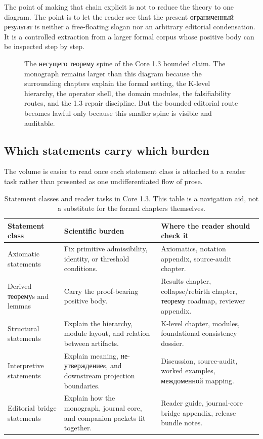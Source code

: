 The point of making that chain explicit is not to reduce the theory to one diagram. The point is
to let the reader see that the present ограниченный результат is neither a free-floating slogan nor an
arbitrary editorial condensation. It is a controlled extraction from a larger formal corpus whose
positive body can be inspected step by step.

\begin{figure}[htbp]
\centering

\caption{The несущего теорему spine of the Core 1.3 bounded claim. The monograph remains
larger than this diagram because the surrounding chapters explain the formal setting, the K-level
hierarchy, the operator shell, the domain modules, the falsifiability routes, and the 1.3 repair
discipline. But the bounded editorial route becomes lawful only because this smaller spine is
visible and auditable.}
\label{fig:oc13-theorem-spine}
\end{figure}

\subsection{Which statements carry which burden}

The volume is easier to read once each statement class is attached to a reader task rather than
presented as one undifferentiated flow of prose.

\begin{table}[htbp]
\centering
\begin{tabular}{p{3.1cm} p{4.7cm} p{5.0cm}}
\toprule
\textbf{Statement class} & \textbf{Scientific burden} & \textbf{Where the reader should check it} \\
\midrule
Axiomatic statements & Fix primitive admissibility, identity, or threshold conditions. & Axiomatics, notation appendix, source-audit chapter. \\
Derived теоремуs and lemmas & Carry the proof-bearing positive body. & Results chapter, collapse/rebirth chapter, теорему roadmap, reviewer appendix. \\
Structural statements & Explain the hierarchy, module layout, and relation between artifacts. & K-level chapter, modules, foundational consistency dossier. \\
Interpretive statements & Explain meaning, не-утверждениеs, and downstream projection boundaries. & Discussion, source-audit, worked examples, междоменной mapping. \\
Editorial bridge statements & Explain how the monograph, journal core, and companion packets fit together. & Reader guide, journal-core bridge appendix, release bundle notes. \\
\bottomrule
\end{tabular}
\caption{Statement classes and reader tasks in Core 1.3. This table is a navigation aid, not a
substitute for the formal chapters themselves.}
\label{tab:oc13-statement-classes}
\end{table}

